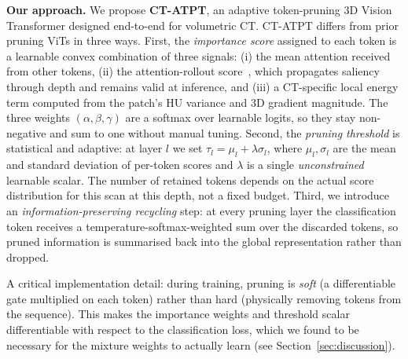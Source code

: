 \documentclass[journal]{IEEEtran}
\begin{document}
\textbf{Our approach.} We propose \textbf{CT-ATPT}, an adaptive token-pruning
3D Vision Transformer designed end-to-end for volumetric CT. CT-ATPT differs
from prior pruning ViTs in three ways. First, the \emph{importance score}
assigned to each token is a learnable convex combination of three signals:
(i) the mean attention received from other tokens, (ii) the
attention-rollout score~\cite{abnar2020}, which propagates saliency through
depth and remains valid at inference, and (iii) a CT-specific local energy
term computed from the patch's HU variance and 3D gradient magnitude. The
three weights $(\alpha,\beta,\gamma)$ are a softmax over learnable logits, so
they stay non-negative and sum to one without manual tuning. Second, the
\emph{pruning threshold} is statistical and adaptive: at layer $l$ we set
$\tau_l = \mu_l + \lambda \sigma_l$, where $\mu_l,\sigma_l$ are the mean and
standard deviation of per-token scores and $\lambda$ is a single
\emph{unconstrained} learnable scalar. The number of retained tokens depends
on the actual score distribution for this scan at this depth, not a fixed
budget. Third, we introduce an \emph{information-preserving recycling} step:
at every pruning layer the classification token receives a
temperature-softmax-weighted sum over the discarded tokens, so pruned
information is summarised back into the global representation rather than
dropped.

A critical implementation detail: during training, pruning is
\emph{soft} (a differentiable gate multiplied on each token) rather than hard
(physically removing tokens from the sequence). This makes the importance
weights and threshold scalar differentiable with respect to the classification
loss, which we found to be necessary for the mixture weights to actually learn
(see Section~\ref{sec:discussion}).
\end{document}
